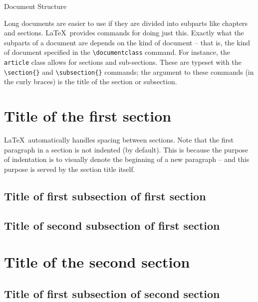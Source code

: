 \documentclass{article}
\begin{document}
\begin{center}
\Large Document Structure
\end{center}

Long documents are easier to use if they are divided into subparts like chapters and sections. \LaTeX\ provides commands for doing just this. Exactly what the subparts of a document are depends on the kind of document -- that is, the kind of document specified in the \verb|\documentclass| command. For instance, the \texttt{article} class allows for sections and sub-sections. These are typeset with the \verb|\section{}| and \verb|\subsection{}| commands; the argument to these commands (in the curly braces) is the title of the section or subsection.

\section{Title of the first section}

\LaTeX\ automatically handles spacing between sections. Note that the first paragraph in a section is not indented (by default). This is because the purpose of indentation is to visually denote the beginning of a new paragraph -- and this purpose is served by the section title itself.

\subsection{Title of first subsection of first section}

\subsection{Title of second subsection of first section}

\section{Title of the second section}

\subsection{Title of first subsection of second section}
\end{document}
